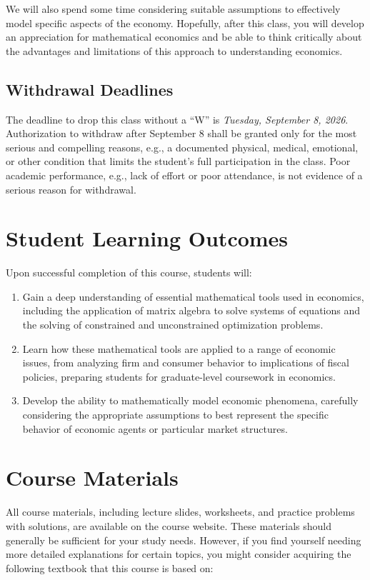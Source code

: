 \documentclass{./../latex/syllabus}
\begin{document}
We will also spend some time considering suitable assumptions to effectively model specific aspects of the economy. Hopefully, after this class, you will develop an appreciation for mathematical economics and be able to think critically about the advantages and limitations of this approach to understanding economics.

\subsection*{Withdrawal Deadlines}

The deadline to drop this class without a ``W'' is \textit{Tuesday, September 8, 2026}. Authorization to withdraw after September 8 shall be granted only for the most serious and compelling reasons, e.g., a documented physical, medical, emotional, or other condition that limits the student's full participation in the class. Poor academic performance, e.g., lack of effort or poor attendance, is not evidence of a serious reason for withdrawal.

\newpage
\section*{Student Learning Outcomes}
Upon successful completion of this course, students will:
\begin{enumerate}
\itemsep0em
  \item Gain a deep understanding of essential mathematical tools used in economics, including the application of matrix algebra to solve systems of equations and the solving of constrained and unconstrained optimization problems.
  \item Learn how these mathematical tools are applied to a range of economic issues, from analyzing firm and consumer behavior to implications of fiscal policies, preparing students for graduate-level coursework in economics.
  \item Develop the ability to mathematically model economic phenomena, carefully considering the appropriate assumptions to best represent the specific behavior of economic agents or particular market structures.
\end{enumerate}

\section*{Course Materials}

All course materials, including lecture slides, worksheets, and practice problems with solutions, are available on the course website. These materials should generally be sufficient for your study needs. However, if you find yourself needing more detailed explanations for certain topics, you might consider acquiring the following textbook that this course is based on:
\end{document}
